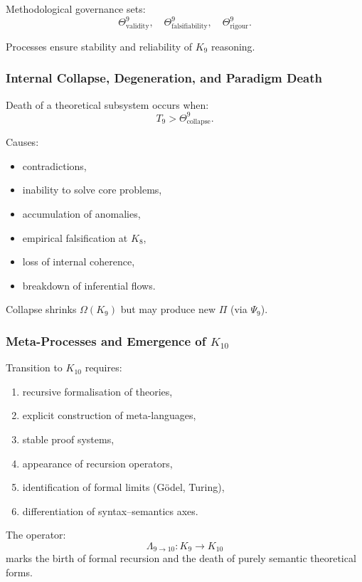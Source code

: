 Methodological governance sets:
\[
\Theta^9_{\text{validity}},\quad
\Theta^9_{\text{falsifiability}},\quad
\Theta^9_{\text{rigour}}.
\]

Processes ensure stability and reliability of $K_9$ reasoning.

\subsubsection{Internal Collapse, Degeneration, and Paradigm Death}

Death of a theoretical subsystem occurs when:
\[
T_9 > \Theta^9_{\text{collapse}}.
\]

Causes:
\begin{itemize}
    \item contradictions,
    \item inability to solve core problems,
    \item accumulation of anomalies,
    \item empirical falsification at $K_8$,
    \item loss of internal coherence,
    \item breakdown of inferential flows.
\end{itemize}

Collapse shrinks $\Omega(K_9)$ but may produce new $\Pi$ (via $\Psi_9$).

\subsubsection{Meta-Processes and Emergence of $K_{10}$}

Transition to $K_{10}$ requires:
\begin{enumerate}
    \item recursive formalisation of theories,
    \item explicit construction of meta-languages,
    \item stable proof systems,
    \item appearance of recursion operators,
    \item identification of formal limits (Gödel, Turing),
    \item differentiation of syntax–semantics axes.
\end{enumerate}

The operator:
\[
\Lambda_{9 \to 10}: K_9 \to K_{10}
\]
marks the birth of formal recursion and the death of purely semantic
theoretical forms.

